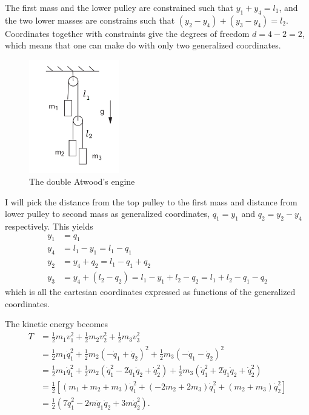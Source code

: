 \documentclass[11pt]{amsart}
\begin{document}
The first mass and the lower pulley are constrained such that $y_1 + y_4 = l_1$, and the two lower masses are constrains such that $(y_2 - y_4) + (y_3 - y_4) = l_2$. Coordinates together with constraints give the degrees of freedom $d = 4 - 2 = 2$, which means that one can make do with only two generalized coordinates.

\begin{figure}
	\centering
	\includegraphics[width = 0.35\textwidth]{./figures/problem2.png}
	\caption{The double Atwood's engine}
	\label{fig:atwood}
\end{figure}

I will pick the distance from the top pulley to the first mass and distance from lower pulley to second mass as generalized coordinates, $q_1=y_1$ and $q_2 = y_2 - y_4$ respectively. This yields 
\begin{align*}
y_1 &= q_1 \\ 
y_4 &= l_1 - y_1 = l_1 - q_1 \\
y_2 &= y_4 + q_2 = l_1 - q_1 + q_2 \\
y_3 &= y_4 + (l_2 - q_2) = l_1 - y_1 + l_2 - q_2 = l_1 + l_2 - q_1 - q_2 
\end{align*}
which is all the cartesian coordinates expressed as functions of the generalized coordinates.

The kinetic energy becomes
\begin{align*}
T 	&= \frac{1}{2}m_1v_1^2 + \frac{1}{2}m_2v_2^2 + \frac{1}{2}m_3v_3^2 \\
	&= \frac{1}{2}m_1\dot{q}_1^2 + \frac{1}{2}m_2(-\dot{q}_1 + \dot{q}_2)^2 + \frac{1}{2}m_3(-\dot{q}_1 - \dot{q}_2)^2 \\
	&= \frac{1}{2}m_1\dot{q}_1^2 + \frac{1}{2}m_2(\dot{q}_1^2 -2\dot{q}_1\dot{q}_2 + \dot{q}_2^2) + \frac{1}{2}m_3(\dot{q}_1^2 + 2\dot{q}_1\dot{q}_2 + \dot{q}_2^2) \\
	&= \frac{1}{2}[ (m_1 + m_2 + m_3)\dot{q}_1^2 + (-2m_2 + 2m_3)\dot{q}_1^2 + (m_2+m_3)\dot{q}_2^2 ] \\
	&= \frac{1}{2}( 7 \dot{q}_1^2 - 2m\dot{q}_1\dot{q}_2 + 3m\dot{q}_2^2).
\end{align*}
\end{document}
